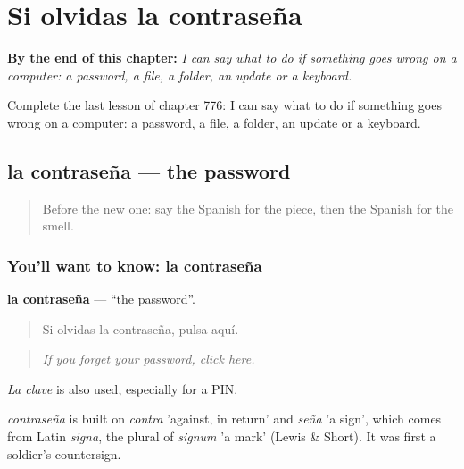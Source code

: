 
\chapter{Si olvidas la contraseña}
\label{ch:es-si-olvidas-la-contrasena}

\begin{chapteropening}
\textbf{By the end of this chapter:} \emph{I can say what to do if something goes wrong on a computer: a password, a file, a folder, an update or a keyboard.}

Complete the last lesson of chapter 776: I can say what to do if something goes wrong on a computer: a password, a file, a folder, an update or a keyboard.
\end{chapteropening}

\section[la contraseña]{la contraseña — the password}

\label{lesson:ES-C776-contrasena}



\begin{quote}
Before the new one: say the Spanish for the piece, then the Spanish for the smell.
\end{quote}

\subsection*{You'll want to know: la contraseña}
\textbf{la contraseña} — \textquotedblleft{}the password\textquotedblright{}.

\begin{quote}
Si olvidas la contraseña, pulsa aquí.
\end{quote}

\begin{quote}
\emph{If you forget your password, click here.}
\end{quote}

\emph{La clave} is also used, especially for a PIN.

\begin{cousinweb}
\emph{contraseña} is built on \emph{contra} 'against, in return' and \emph{seña} 'a sign', which comes from Latin \emph{signa}, the plural of \emph{signum} 'a mark' (Lewis \& Short). It was first a soldier's countersign.
\end{cousinweb}

